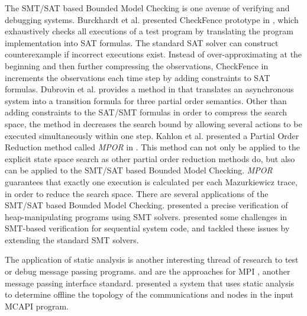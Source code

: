 The SMT/SAT based Bounded Model Checking is one avenue of verifying and debugging systems. Burckhardt et al. presented CheckFence prototype in \cite{burckhardt:pldi07}, which exhaustively checks all executions of a test program by translating the program implementation into SAT formulas. The standard SAT solver can construct counterexample if incorrect executions exist. Instead of over-approximating at the beginning and then further compressing the observations, CheckFence in \cite{burckhardt:pldi07} increments the observations each time step by adding constraints to SAT formulas. Dubrovin et al. provides a method in \cite{heljanko:scp} that translates an asynchronous system into a transition formula for three partial order semantics. Other than adding constraints to the SAT/SMT formulas in order to compress the search space, the method in \cite{heljanko:scp} decreases the search bound by allowing several actions to be executed simultaneously within one step. Kahlon et al. presented a Partial Order Reduction method called \textit{MPOR} in \cite{kahlon:cav09}. This method can not only be applied to the explicit state space search as other partial order reduction methods do, but also can be applied to the SMT/SAT based Bounded Model Checking. \textit{MPOR} guarantees that exactly one execution is calculated per each Mazurkiewicz trace, in order to reduce the search space. There are several applications of the SMT/SAT based Bounded Model Checking. \cite{lahiri:popl08} presented a precise verification of heap-manipulating programs using SMT solvers. \cite{lahiri:cav11} presented some challenges in SMT-based verification for sequential system code, and tackled these issues by extending the standard SMT solvers.

The application of static analysis is another interesting thread of research to test or debug message passing programs. \cite{zhang:ppopp07} and \cite{greg:cgo09} are the approaches for MPI \cite{mpi}, another message passing interface standard. \cite{gray:lctes11} presented a system that uses static analysis to determine offline the topology of the communications and nodes in the input MCAPI program.
